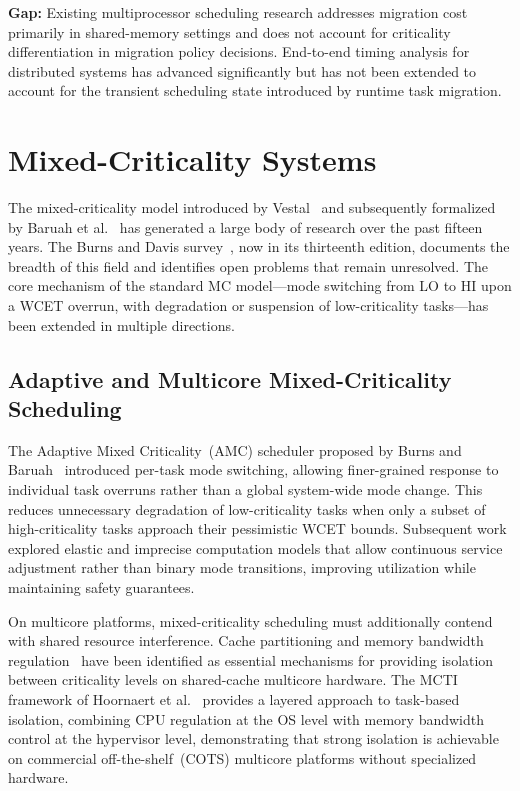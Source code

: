 \textbf{Gap:} Existing multiprocessor scheduling research addresses migration cost
primarily in shared-memory settings and does not account for criticality
differentiation in migration policy decisions. End-to-end timing analysis for
distributed systems has advanced significantly but has not been extended to
account for the transient scheduling state introduced by runtime task migration.

\section{Mixed-Criticality Systems}
\label{sec:rw_mcs}

The mixed-criticality model introduced by Vestal~\cite{vestal2007} and subsequently
formalized by Baruah et al.~\cite{baruah2011} has generated a large body of research
over the past fifteen years. The Burns and Davis survey~\cite{burns2017}, now in its
thirteenth edition, documents the breadth of this field and identifies open problems
that remain unresolved. The core mechanism of the standard MC model---mode switching
from LO to HI upon a WCET overrun, with degradation or suspension of low-criticality
tasks---has been extended in multiple directions.

\subsection{Adaptive and Multicore Mixed-Criticality Scheduling}
\label{subsec:rw_mc_adaptive}

The Adaptive Mixed Criticality~(AMC) scheduler proposed by Burns and
Baruah~\cite{burns2013} introduced per-task mode switching, allowing finer-grained
response to individual task overruns rather than a global system-wide mode change.
This reduces unnecessary degradation of low-criticality tasks when only a subset of
high-criticality tasks approach their pessimistic WCET bounds. Subsequent work
explored elastic and imprecise computation models that allow continuous service
adjustment rather than binary mode transitions, improving utilization while
maintaining safety guarantees.

On multicore platforms, mixed-criticality scheduling must additionally contend with
shared resource interference. Cache partitioning and memory bandwidth
regulation~\cite{mancuso2013} have been identified as essential mechanisms for
providing isolation between criticality levels on shared-cache multicore hardware.
The MCTI framework of Hoornaert et al.~\cite{hoornaert2024} provides a layered
approach to task-based isolation, combining CPU regulation at the OS level with
memory bandwidth control at the hypervisor level, demonstrating that strong isolation
is achievable on commercial off-the-shelf~(COTS) multicore platforms without
specialized hardware.


